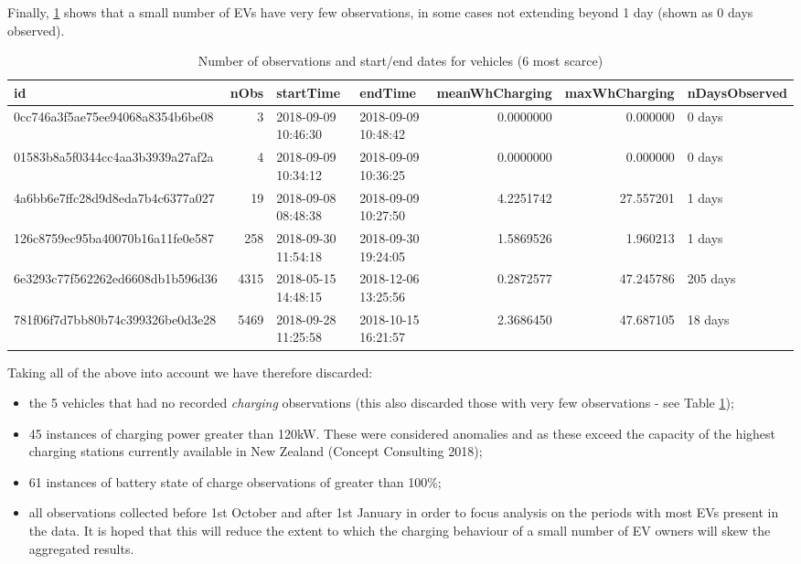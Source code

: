 \documentclass[]{article}
\providecommand{\tightlist}{%
  \setlength{\itemsep}{0pt}\setlength{\parskip}{0pt}}
\begin{document}
Finally, \ref{tab:noObsEVs} shows that a small number of EVs have very few observations, in some cases not extending beyond 1 day (shown as 0 days observed).

\begin{table}[t]

\caption{\label{tab:noObsEVs}Number of observations and start/end dates for vehicles (6 most scarce)}
\centering
\begin{tabular}{l|r|l|l|r|r|l}
\hline
id & nObs & startTime & endTime & meanWhCharging & maxWhCharging & nDaysObserved\\
\hline
0cc746a3f5ae75ee94068a8354b6be08 & 3 & 2018-09-09 10:46:30 & 2018-09-09 10:48:42 & 0.0000000 & 0.000000 & 0 days\\
\hline
01583b8a5f0344cc4aa3b3939a27af2a & 4 & 2018-09-09 10:34:12 & 2018-09-09 10:36:25 & 0.0000000 & 0.000000 & 0 days\\
\hline
4a6bb6e7ffc28d9d8eda7b4c6377a027 & 19 & 2018-09-08 08:48:38 & 2018-09-09 10:27:50 & 4.2251742 & 27.557201 & 1 days\\
\hline
126c8759ec95ba40070b16a11fe0e587 & 258 & 2018-09-30 11:54:18 & 2018-09-30 19:24:05 & 1.5869526 & 1.960213 & 1 days\\
\hline
6e3293c77f562262ed6608db1b596d36 & 4315 & 2018-05-15 14:48:15 & 2018-12-06 13:25:56 & 0.2872577 & 47.245786 & 205 days\\
\hline
781f06f7d7bb80b74c399326be0d3e28 & 5469 & 2018-09-28 11:25:58 & 2018-10-15 16:21:57 & 2.3686450 & 47.687105 & 18 days\\
\hline
\end{tabular}
\end{table}

Taking all of the above into account we have therefore discarded:

\begin{itemize}
\tightlist
\item
  the 5 vehicles that had no recorded \emph{charging} observations (this also discarded those with very few observations - see Table \ref{tab:noObsEVs});
\item
  45 instances of charging power greater than 120kW. These were considered anomalies and as these exceed the capacity of the highest charging stations currently available in New Zealand (Concept Consulting 2018);
\item
  61 instances of battery state of charge observations of greater than 100\%;
\item
  all observations collected before 1st October and after 1st January in order to focus analysis on the periods with most EVs present in the data. It is hoped that this will reduce the extent to which the charging behaviour of a small number of EV owners will skew the aggregated results.
\end{itemize}
\end{document}
